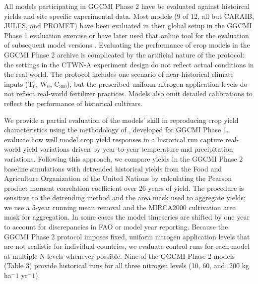 \documentclass[gmd, manuscript]{copernicus} %
\begin{document}
All models participating in GGCMI Phase 2 have be evaluated against histoircal yields and site specific experimental data.
Most models (9 of 12, all but  CARAIB, JULES, and PROMET) have been evaluated in their global setup in the GGCMI Phase 1 evaluation exercise \citep{muller_global_2017} or have later used that online tool for the evaluation of subsequent model versions \citep[e.g.][]{von_Bloh_implementing_2018}.
Evaluating the performance of crop models in the GGCMI Phase 2 archive is complicated by the artificial nature of the protocol: the settings in the CTWN-A experiment design do not reflect actual conditions in the real world. 
The protocol includes one scenario of near-historical climate inputs (T$_0$, W$_0$, C$_{360}$), but the prescribed uniform nitrogen application levels do not reflect real-world fertilizer practices. Models also omit detailed calibrations to reflect the performance of historical cultivars. 

We provide a partial evaluation of the models’ skill in reproducing crop yield characteristics using the methodology of \citet{muller_global_2017}, developed for GGCMI Phase 1.
\citet{muller_global_2017} evaluate how well model crop yield responses in a historical run capture real-world yield variations driven by year-to-year temperature and precipitation variations. 
Following this approach, we compare yields in the GGCMI Phase 2 baseline simulations with detrended historical yields from the Food and Agriculture Organization of the United Nations \citep{FAOSTAT} by calculating the Pearson product moment correlation coefficient over 26 years of yield.
The procedure is sensitive to the detrending method and the area mask used to aggregate yields; we use a 5-year running mean removal and the MIRCA2000 cultivation area mask for aggregation. 
In some cases the model timeseries are shifted by one year to account for discrepancies in FAO or model year reporting. 
Because the GGCMI Phase 2 protocol imposes fixed, uniform nitrogen application levels that are not realistic for individual countries, we evaluate control runs for each model at multiple N levels whenever possible. 
Nine of the GGCMI Phase 2 models (Table 3) provide historical runs for all three nitrogen levels (10, 60, and. 200 kg ha$^-1$ yr$^-1$).
\end{document}

